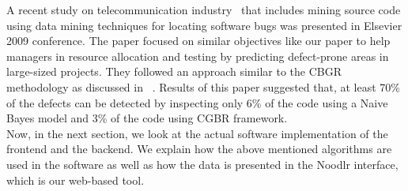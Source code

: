 A recent study on telecommunication industry~\cite{turhan2009data} that includes mining source code using data mining techniques for locating software bugs was presented in Elsevier 2009 conference. The paper focused on similar objectives like our paper to help managers in resource allocation and testing by predicting defect-prone areas in large-sized projects. They followed an approach similar to the CBGR methodology as discussed in ~\cite{turhan2008software}. Results of this paper suggested that, at least 70\% of the defects can be detected by inspecting only 6\% of the code using a Naive Bayes model and 3\% of the code using CGBR framework.\\

Now, in the next section, we look at the actual software implementation of the frontend and the backend. We explain how the above mentioned algorithms are used in the software as well as how the data is presented in the Noodlr interface, which is our web-based tool.

